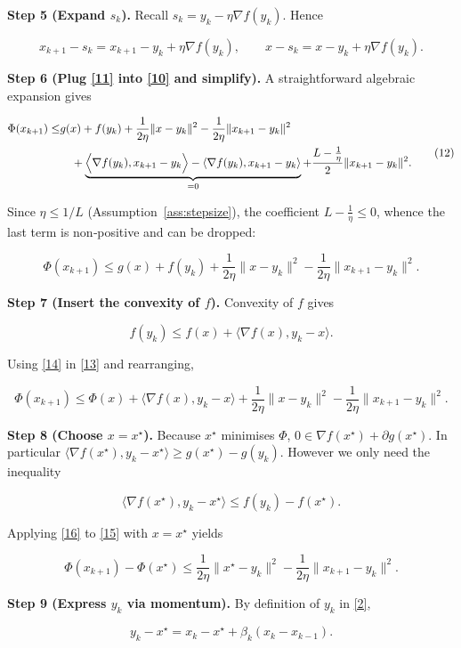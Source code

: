 \documentclass{article}
\begin{document}
\noindent\textbf{Step 5 (Expand $s_k$).} Recall $s_k=y_k-\eta\nabla f(y_k)$. Hence  

\[
x_{k+1}-s_k = x_{k+1}-y_k+\eta\nabla f(y_k),\qquad
x-s_k = x-y_k+\eta\nabla f(y_k).
\tag{11}
\]

\noindent\textbf{Step 6 (Plug \eqref{11} into \eqref{10} and simplify).}  
A straightforward algebraic expansion gives  

\[
\begin{aligned}
\Phi(x_{k+1})\le
&g(x)+f(y_k)
+\frac{1}{2\eta}\|x-y_k\|^{2}
-\frac{1}{2\eta}\|x_{k+1}-y_k\|^{2}\\
&\quad +\underbrace{\Bigl\langle\nabla f(y_k),x_{k+1}-y_k\Bigr\rangle
-\langle\nabla f(y_k),x_{k+1}-y_k\rangle}_{=0}
+\frac{L-\frac{1}{\eta}}{2}\|x_{k+1}-y_k\|^{2}.
\end{aligned}
\tag{12}
\]

Since $\eta\le1/L$ (Assumption~\ref{ass:stepsize}), the coefficient $L-\frac{1}{\eta}\le0$, whence the last term is non‑positive and can be dropped:

\[
\Phi(x_{k+1})\le g(x)+f(y_k)+\frac{1}{2\eta}\|x-y_k\|^{2}
-\frac{1}{2\eta}\|x_{k+1}-y_k\|^{2}.
\tag{13}
\]

\noindent\textbf{Step 7 (Insert the convexity of $f$).} Convexity of $f$ gives  

\[
f(y_k)\le f(x)+\langle\nabla f(x),y_k-x\rangle .
\tag{14}
\]

Using \eqref{14} in \eqref{13} and rearranging,

\[
\Phi(x_{k+1})\le \Phi(x)+\langle\nabla f(x),y_k-x\rangle
+\frac{1}{2\eta}\|x-y_k\|^{2}
-\frac{1}{2\eta}\|x_{k+1}-y_k\|^{2}.
\tag{15}
\]

\noindent\textbf{Step 8 (Choose $x=x^\star$).} Because $x^\star$ minimises $\Phi$, $0\in\nabla f(x^\star)+\partial g(x^\star)$. In particular $\langle\nabla f(x^\star),y_k-x^\star\rangle\ge g(x^\star)-g(y_k)$. However we only need the inequality  

\[
\langle\nabla f(x^\star),y_k-x^\star\rangle\le f(y_k)-f(x^\star).
\tag{16}
\]

Applying \eqref{16} to \eqref{15} with $x=x^\star$ yields  

\[
\Phi(x_{k+1})- \Phi(x^\star)
\le
\frac{1}{2\eta}\|x^\star-y_k\|^{2}
-\frac{1}{2\eta}\|x_{k+1}-y_k\|^{2}.
\tag{17}
\]

\noindent\textbf{Step 9 (Express $y_k$ via momentum).} By definition of $y_k$ in \eqref{2},

\[
y_k - x^\star = x_k - x^\star + \beta_k (x_k - x_{k-1}).
\tag{18}
\]
\end{document}
